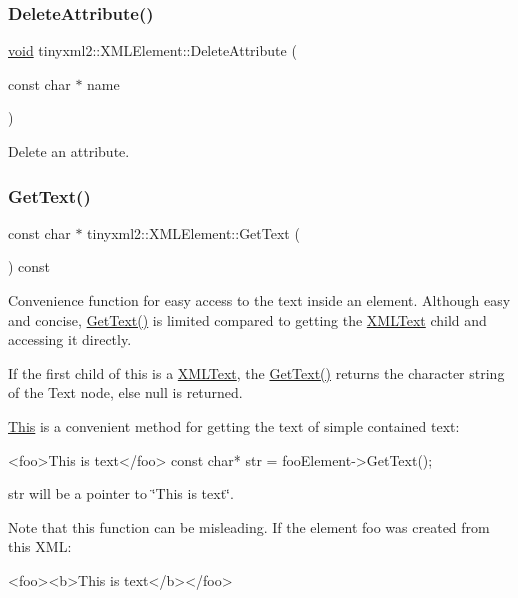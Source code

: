 \subsubsection{\texorpdfstring{Delete\+Attribute()}{DeleteAttribute()}}
{\footnotesize\ttfamily \hyperlink{interfacevoid}{void} tinyxml2\+::\+X\+M\+L\+Element\+::\+Delete\+Attribute (\begin{DoxyParamCaption}\item[{const char $\ast$}]{name }\end{DoxyParamCaption})}

Delete an attribute. \mbox{\label{classtinyxml2_1_1_x_m_l_element_a0fa5bea0a4daf3ddd503dcabb823eba6}} 
\subsubsection{\texorpdfstring{Get\+Text()}{GetText()}}
{\footnotesize\ttfamily const char $\ast$ tinyxml2\+::\+X\+M\+L\+Element\+::\+Get\+Text (\begin{DoxyParamCaption}{ }\end{DoxyParamCaption}) const}

Convenience function for easy access to the text inside an element. Although easy and concise, \hyperlink{classtinyxml2_1_1_x_m_l_element_a0fa5bea0a4daf3ddd503dcabb823eba6}{Get\+Text()} is limited compared to getting the \hyperlink{classtinyxml2_1_1_x_m_l_text}{X\+M\+L\+Text} child and accessing it directly.

If the first child of \textquotesingle{}this\textquotesingle{} is a \hyperlink{classtinyxml2_1_1_x_m_l_text}{X\+M\+L\+Text}, the \hyperlink{classtinyxml2_1_1_x_m_l_element_a0fa5bea0a4daf3ddd503dcabb823eba6}{Get\+Text()} returns the character string of the Text node, else null is returned.

\hyperlink{namespace_this}{This} is a convenient method for getting the text of simple contained text\+: \begin{DoxyVerb}<foo>This is text</foo>
    const char* str = fooElement->GetText();
\end{DoxyVerb}


\textquotesingle{}str\textquotesingle{} will be a pointer to \char`\"{}\+This is text\char`\"{}.

Note that this function can be misleading. If the element foo was created from this X\+ML\+: \begin{DoxyVerb}    <foo><b>This is text</b></foo>
\end{DoxyVerb}


